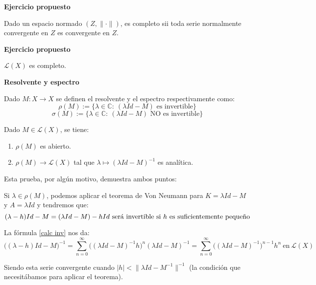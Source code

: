 \documentclass[openany]{book}
\begin{document}
\begin{exercise}
    \textbf{Ejercicio propuesto}

    Dado un espacio normado $ (Z,\|\cdot \|)$, es completo sii toda serie normalmente convergente en $ Z$ es convergente en $ Z$.
\end{exercise}

\begin{exercise}
    \textbf{Ejercicio propuesto}

    $ \mathcal{L}(X)$ es completo.
\end{exercise}


\begin{definition}
    \textbf{Resolvente y espectro}

    Dado $ M: X\to X$ se definen el resolvente y el espectro respectivamente como:
    $$ \rho(M):= \{\lambda  \in \mathbb{C}:\ (\lambda Id-M) \text{ es invertible}\} $$
    $$ \sigma(M):= \{\lambda  \in \mathbb{C}:\ (\lambda Id-M) \text{ NO es invertible}\} $$
\end{definition}

\begin{theorem}
    Dado $ M \in \mathcal{L}(X)$, se tiene:
    
    \begin{enumerate}
        \item $ \rho(M)$ es abierto.
        \item $ \rho(M ) \to \mathcal{L}(X)$ tal que $ \lambda \mapsto (\lambda  Id -M) ^{-1}$ es analítica.
    \end{enumerate}
\end{theorem}

Esta prueba, por algún motivo, demuestra ambos puntos: 
\begin{demonstration}


    Si $ \lambda  \in \rho(M)$, podemos aplicar el teorema de Von Neumann para $ K = \lambda  Id - M$ y $ A = \lambda  Id$ y tendremos que:
    $$ (\lambda  -h) Id -M = (\lambda  Id-M) -hId \text{ será invertible si $ h$ es suficientemente pequeño} $$

    La fórmula \eqref{calc inv} nos da:
    \begin{equation}
        \Big ( (\lambda  -h)Id -M \Big ) ^{-1} = \sum\limits_{n=0}^{\infty} \Big ( (\lambda  Id -M)^{-1} h \Big ) ^{n} (\lambda Id - M) ^{-1} = \sum\limits_{n=0}^{\infty} \Big ( (\lambda  Id- M) ^{-1} \Big ) ^{n-1} h^{n}\ \text{en}\ \mathcal{L}(X) 
        \label{inv segunda}
        \end{equation}
    

    Siendo esta serie convergente cuando $ |h|<\|\lambda  Id -M ^{-1}\| ^{-1}$ (la condición que necesitábamos para aplicar el teorema).

\end{demonstration}
\end{document}
